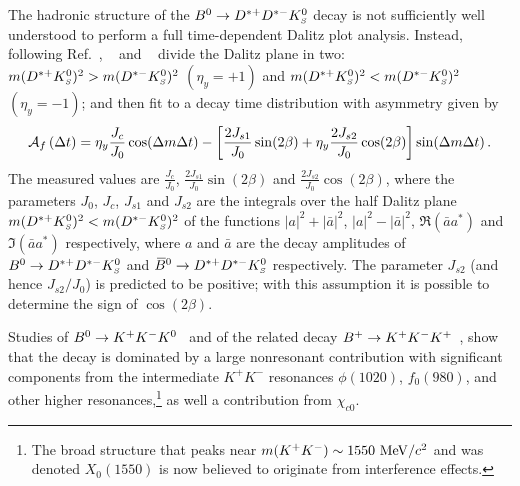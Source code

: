 \label{sec:cp_uta:notations:dalitz:dstardstarks}

The hadronic structure of the $B^0 \to D^{*+}D^{*-}K^0_{\scriptscriptstyle S}$ decay
is not sufficiently well understood to perform a full 
time-dependent Dalitz plot analysis.
Instead, following Ref.~\cite{Browder:1999ng},
\babar~\cite{Aubert:2006fh} and \belle~\cite{Dalseno:2007hx} divide the Dalitz plane in two:
$m(D^{*+}K^0_{\scriptscriptstyle S})^2 > m(D^{*-}K^0_{\scriptscriptstyle S})^2$ $(\eta_y = +1)$ and 
$m(D^{*+}K^0_{\scriptscriptstyle S})^2 < m(D^{*-}K^0_{\scriptscriptstyle S})^2$ $(\eta_y = -1)$;
and then fit to a decay time distribution with asymmetry given by
\begin{equation}
  {\cal A}_{f} \left(\Delta t\right) =
  \eta_y \frac{J_c}{J_0} \cos(\Delta m \Delta t) -  
  \left[ 
    \frac{2J_{s1}}{J_0} \sin(2\beta) + \eta_y \frac{2J_{s2}}{J_0} \cos(2\beta) 
  \right] \sin(\Delta m \Delta t) \, .
\end{equation}
The measured values are $\frac{J_c}{J_0}$, $\frac{2J_{s1}}{J_0} \sin(2\beta)$
and $\frac{2J_{s2}}{J_0} \cos(2\beta)$, 
where the parameters $J_0$, $J_c$, $J_{s1}$ and $J_{s2}$ are the integrals 
over the half Dalitz plane $m(D^{*+}K^0_{\scriptscriptstyle S})^2 < m(D^{*-}K^0_{\scriptscriptstyle S})^2$ 
of the functions $|a|^2 + |\bar{a}|^2$, $|a|^2 - |\bar{a}|^2$, 
$\Re(\bar{a}a^*)$ and $\Im(\bar{a}a^*)$ respectively, 
where $a$ and $\bar{a}$ are the decay amplitudes of 
$B^0 \to D^{*+}D^{*-}K^0_{\scriptscriptstyle S}$ and $\kern 0.18em\overline{\kern -0.18em B}{}^0 \to D^{*+}D^{*-}K^0_{\scriptscriptstyle S}$ respectively. 
The parameter $J_{s2}$ (and hence $J_{s2}/J_0$) is predicted to be positive;
with this assumption it is possible to determine the sign of $\cos(2\beta)$.

\label{sec:cp_uta:notations:dalitz:kkk0}

Studies of $B^0 \to K^+K^-K^0$~\cite{Aubert:2007sd,Nakahama:2010nj,Lees:2012kx} 
and of the related decay 
$B^{+} \to K^+K^-K^+$~\cite{Garmash:2004wa,Aubert:2006nu,Lees:2012kx},
show that the decay is dominated by a large nonresonant contribution
with significant components from the 
intermediate $K^+K^-$ resonances $\phi(1020)$, $f_0(980)$,
and other higher resonances,\footnote{
  The broad structure that peaks near 
  $m(K^+K^-) \sim 1550 \ {\rm MeV}/c^2$ and was denoted $X_0(1550)$ 
  is now believed to originate from interference effects.
}
as well a contribution from $\chi_{c0}$.

